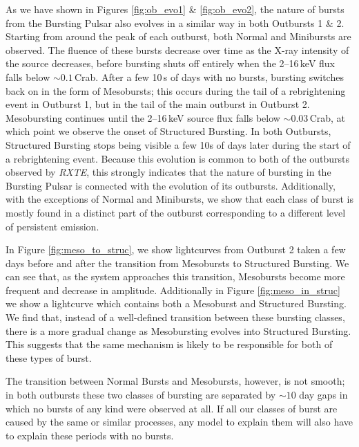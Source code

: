 
\par As we have shown in Figures \ref{fig:ob_evo1} \& \ref{fig:ob_evo2}, the nature of bursts from the Bursting Pulsar also evolves in a similar way in both Outbursts 1 \& 2.  Starting from around the peak of each outburst, both Normal and Minibursts are observed.  The fluence of these bursts decrease over time as the X-ray intensity of the source decreases, before bursting shuts off entirely when the 2--16\,keV flux falls below $\sim0.1$\,Crab.  After a few 10\,s of days with no bursts, bursting switches back on in the form of Mesobursts; this occurs during the tail of a rebrightening event in Outburst 1, but in the tail of the main outburst in Outburst 2.  Mesobursting continues until the 2--16\,keV source flux falls below $\sim0.03$\,Crab, at which point we observe the onset of Structured Bursting.  In both Outbursts, Structured Bursting stops being visible a few 10s of days later during the start of a rebrightening event.  Because this evolution is common to both of the outbursts observed by \textit{RXTE}, this strongly indicates that the nature of bursting in the Bursting Pulsar is connected with the evolution of its outbursts.  Additionally, with the exceptions of Normal and Minibursts, we show that each class of burst is mostly found in a distinct part of the outburst corresponding to a different level of persistent emission.
\par In Figure \ref{fig:meso_to_struc}, we show lightcurves from Outburst 2 taken a few days before and after the transition from Mesobursts to Structured Bursting.  We can see that, as the system approaches this transition, Mesobursts become more frequent and decrease in amplitude.  Additionally in Figure \ref{fig:meso_in_struc} we show a lightcurve which contains both a Mesoburst and Structured Bursting.  We find that, instead of a well-defined transition between these bursting classes, there is a more gradual change as Mesobursting evolves into Structured Bursting.  This suggests that the same mechanism is likely to be responsible for both of these types of burst.
\par The transition between Normal Bursts and Mesobursts, however, is not smooth; in both outbursts these two classes of bursting are separated by $\sim10$ day gaps in which no bursts of any kind were observed at all.  If all our classes of burst are caused by the same or similar processes, any model to explain them will also have to explain these periods with no bursts.

